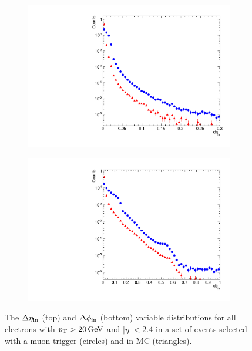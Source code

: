 \begin{figure}[!htbp]
    \centering
    \begin{subfigure}[b]{0.65\textwidth}
        \includegraphics[width=\textwidth]{figures/deta.pdf}
        \caption{}
        \label{fig:deta}
    \end{subfigure}
    \begin{subfigure}[b]{0.65\textwidth}
        \includegraphics[width=\textwidth]{figures/dphi.pdf}
        \caption{}
        \label{fig:dphi}
    \end{subfigure}
    \caption{
        The $\Delta \eta_{\text{in}}$ (top) and $\Delta \phi_{\text{in}}$ (bottom) variable distributions for
        all electrons with $p_{\mathrm{T}} > 20 \,\text{Ge\hspace{-.08em}V}$ and $|\eta| < 2.4$ in a set of
        events selected with a muon trigger (circles) and in \MADGRAPH \Ztoee
        MC (triangles).
    }
    \label{fig:dtrack}
\end{figure}

